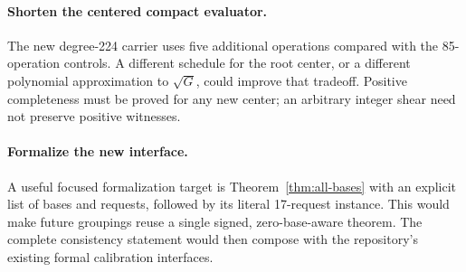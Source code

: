 \documentclass[11pt]{article}
\theoremstyle{definition}\newtheorem{definition}[theorem]{Definition}
\theoremstyle{remark}\newtheorem{remark}[theorem]{Remark}
\begin{document}
\paragraph{Shorten the centered compact evaluator.}
The new degree-224 carrier uses five additional operations compared with
the 85-operation controls. A different schedule for the root center, or
a different polynomial approximation to $\sqrt G$, could improve that
tradeoff. Positive completeness must be proved for any new center;
an arbitrary integer shear need not preserve positive witnesses.

\paragraph{Formalize the new interface.}
A useful focused formalization target is Theorem~\ref{thm:all-bases}
with an explicit list of bases and requests, followed by its literal
17-request instance. This would make future groupings reuse a single
signed, zero-base-aware theorem. The complete consistency statement would
then compose with the repository's existing formal calibration interfaces.
\end{document}
